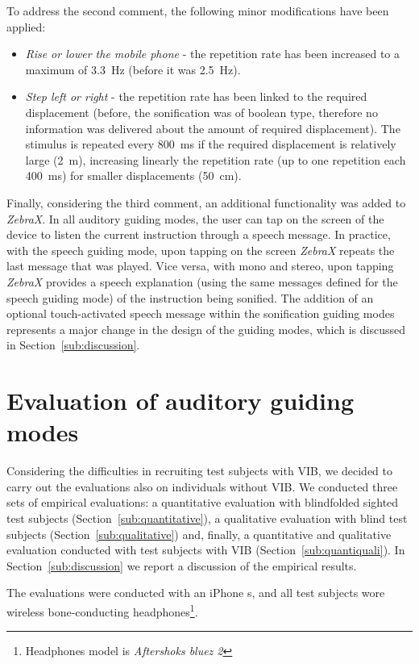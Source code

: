 \documentclass{article}
\newcommand{\zebra}{\emph{ZebraX}}
\begin{document}
To address the second comment, the following minor modifications have been applied:
\begin{itemize}
\item \emph{Rise or lower the mobile phone} - the repetition rate has been increased to a maximum of 3.3~Hz (before it was 2.5~Hz).
\item \emph{Step left or right} - the repetition rate has been linked to the required displacement (before, the sonification was of boolean type, therefore no information was delivered about the amount of required displacement). The stimulus is repeated every 800~ms if the required displacement is relatively large (2~m), increasing linearly the repetition rate (up to one repetition each 400~ms) for smaller displacements (50~cm).
\end{itemize}

Finally, considering the third comment, an additional functionality was added to \zebra{}. In all auditory guiding modes, the user can tap on the screen of the device to listen the current instruction through a speech message.
In practice, with the speech guiding mode, upon tapping on the screen \zebra{} repeats the last message that was played.
Vice versa, with mono and stereo, upon tapping \zebra{} provides a speech explanation (using the same messages defined for the speech guiding mode) of the instruction being sonified.
The addition of an optional touch-activated speech message within the sonification guiding modes represents a major change in the design of the guiding modes, which is discussed in Section~\ref{sub:discussion}.





\section{Evaluation of auditory guiding modes}
\label{sec:finalEval}
Considering the difficulties in recruiting test subjects with VIB, we decided to carry out the evaluations also on individuals without VIB.
We conducted three sets of empirical evaluations: a quantitative evaluation with  blindfolded sighted test subjects (Section~\ref{sub:quantitative}), a qualitative evaluation with  blind test subjects (Section~\ref{sub:qualitative}) and, finally, a quantitative and qualitative evaluation conducted with  test subjects with VIB (Section~\ref{sub:quantiquali}).
In Section~\ref{sub:discussion} we report a discussion of the empirical results.

The evaluations were conducted with an iPhone s, and all test subjects wore wireless bone-conducting headphones\footnote{Headphones model is \emph{Aftershoks bluez 2}}.
\end{document}
